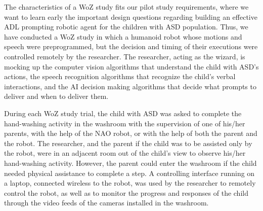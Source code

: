 The characteristics of a WoZ study fits our pilot study requirements, where we want to learn early the important design questions regarding building an effective ADL prompting robotic agent for the children with ASD population.  Thus, we have conducted a WoZ study in which a humanoid robot whose motions and speech were preprogrammed, but the decision and timing of their executions were controlled remotely by the researcher.  The researcher, acting as the wizard, is mocking up the computer vision algorithms that understand the child with ASD's actions, the speech recognition algorithms that recognize the child's verbal interactions, and the AI decision making algorithms that decide what prompts to deliver and when to deliver them.

During each WoZ study trial, the child with ASD was asked to complete the hand-washing activity in the washroom with the supervision of one of his/her parents, with the help of the NAO robot, or with the help of both the parent and the robot. The researcher, and the parent if the child was to be assisted only by the robot, were in an adjacent room out of the child's view to observe his/her hand-washing activity.  However, the parent could enter the washroom if the child needed physical assistance to complete a step. A controlling interface running on a laptop, connected wireless to the robot, was used by the researcher to remotely control the robot, as well as to monitor the progress and responses of the child through the video feeds of the cameras installed in the washroom.

